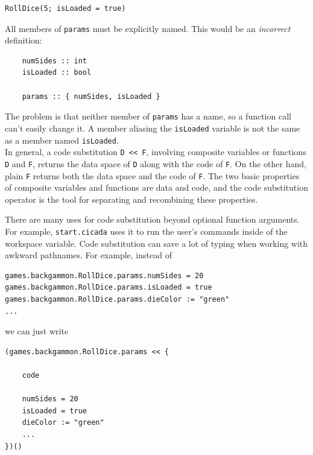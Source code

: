 \documentclass{article}
\newenvironment{code}{
       \begin{list}{}{
               \setlength{\leftmargin}{.4in}
               \setlength{\rightmargin}{0in}
               \setlength{\topsep}{.2in}
       }
       \small
       \item[] }
       { \end{list}   }
\begin{document}
\begin{code} \begin{verbatim}
RollDice(5; isLoaded = true)
\end{verbatim} \end{code}

All members of \verb#params# must be explicitly named.  This would be an \emph{incorrect} definition:

\begin{code} \begin{verbatim}
    numSides :: int
    isLoaded :: bool
    
    params :: { numSides, isLoaded }
\end{verbatim} \end{code}

\noindent The problem is that neither member of \verb#params# has a name, so a function call can't easily change it.  A member aliasing the \verb#isLoaded# variable is not the same as a member named \verb#isLoaded#.\\


In general, a code substitution \verb#D << F#, involving composite variables or functions \verb#D# and \verb#F#, returns the data space of \verb#D# along with the code of \verb#F#.  On the other hand, plain \verb#F# returns both the data space and the code of \verb#F#.  The two basic properties of composite variables and functions are data and code, and the code substitution operator is the tool for separating and recombining these properties.

There are many uses for code substitution beyond optional function arguments.  For example, \verb#start.cicada# uses it to run the user's commands inside of the workspace variable.  Code substitution can save a lot of typing when working with awkward pathnames.  For example, instead of

\begin{code} \begin{verbatim}
games.backgammon.RollDice.params.numSides = 20
games.backgammon.RollDice.params.isLoaded = true
games.backgammon.RollDice.params.dieColor := "green"
...
\end{verbatim} \end{code}

\noindent we can just write

\begin{code} \begin{verbatim}
(games.backgammon.RollDice.params << {
    
    code
    
    numSides = 20
    isLoaded = true
    dieColor := "green"
    ...
})()
\end{verbatim} \end{code}
\end{document}
